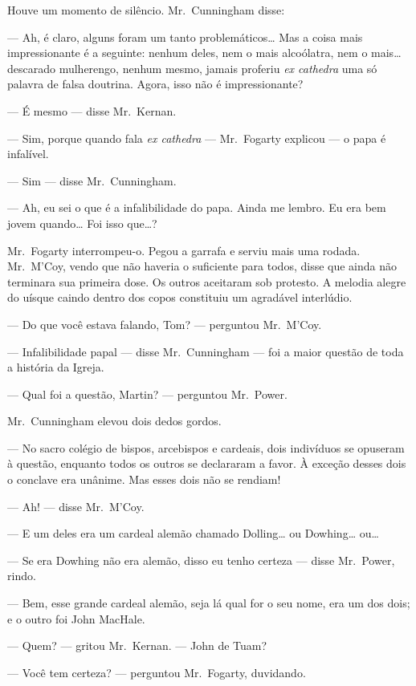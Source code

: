 Houve um momento de silêncio.  Mr.~Cunningham disse:

--- Ah, é claro, alguns foram um tanto problemáticos\ldots{} Mas a coisa mais
impressionante é a seguinte: nenhum deles, nem o mais alcoólatra, nem o
mais\ldots{} descarado mulherengo, nenhum mesmo, jamais proferiu \textit{ex
cathedra} uma só palavra de falsa doutrina.  Agora, isso não é impressionante?

--- É mesmo --- disse Mr.~Kernan.

--- Sim, porque quando fala \textit{ex cathedra} --- Mr.~Fogarty explicou ---
o papa é infalível.

--- Sim --- disse Mr.~Cunningham.

--- Ah, eu sei o que é a infalibilidade do papa.  Ainda me lembro.  Eu era bem
jovem quando\ldots{}  Foi isso que\ldots{}?

Mr.~Fogarty interrompeu-o.  Pegou a garrafa e serviu mais uma rodada.  
Mr.~M’Coy, vendo que não haveria o suficiente para todos, disse que ainda não
terminara sua primeira dose.  Os outros aceitaram sob protesto.  A melodia
alegre do uísque caindo dentro dos copos constituiu um agradável interlúdio.

--- Do que você estava falando, Tom? --- perguntou Mr.~M’Coy.

--- Infalibilidade papal --- disse Mr.~Cunningham --- foi a maior questão de
toda a história da Igreja.

--- Qual foi a questão, Martin? --- perguntou Mr.~Power.

Mr.~Cunningham elevou dois dedos gordos.

--- No sacro colégio de bispos, arcebispos e cardeais, dois indivíduos se
opuseram à questão, enquanto todos os outros se declararam a favor.  À exceção
desses dois o conclave era unânime.  Mas esses dois não se rendiam!

--- Ah! --- disse Mr.~M’Coy.

--- E um deles era um cardeal alemão chamado Dolling\ldots{} ou Dowhing\ldots{}
ou\ldots{}

--- Se era Dowhing não era alemão, disso eu tenho certeza --- disse Mr.~Power,
rindo.

--- Bem, esse grande cardeal alemão, seja lá qual for o seu nome, era um dos
dois; e o outro foi John MacHale.

--- Quem? --- gritou Mr.~Kernan.  --- John de Tuam?

--- Você tem certeza? --- perguntou Mr.~Fogarty, duvidando.

